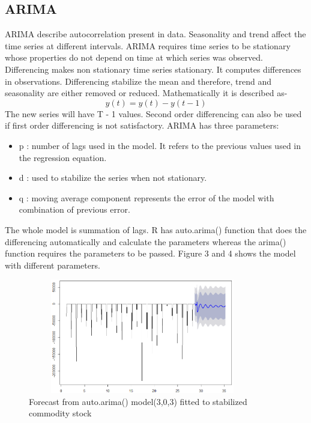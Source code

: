 \documentclass[runningheads]{llncs}
\begin{document}
\subsection{ARIMA}
ARIMA describe autocorrelation present in data. Seasonality and trend affect the time series at different intervals. ARIMA requires time series to be stationary whose properties do not depend on time at which series was observed.
\linebreak
Differencing makes non stationary time series stationary. It computes differences in observations. Differencing stabilize the mean and therefore, trend and seasonality are either removed or reduced. Mathematically it is described as-
\begin{equation*}
  y(t) = y(t) - y(t-1) 
\end{equation*}
The new series will have T - 1 values. Second order differencing can also be used if first order differencing is not satisfactory.
ARIMA has three parameters:
\begin{itemize}
\item p : number of lags used in the model. It refers to the previous values used in the regression equation.
\item d : used to stabilize the series when not stationary.
\item q : moving average component represents the error of the model with combination of previous error.
\end{itemize}

The whole model is summation of lags. R has auto.arima() function that does the differencing automatically and calculate the parameters whereas the arima() function requires the parameters to be passed. Figure 3 and 4 shows the model with different parameters.

\begin{figure}
\centering
\includegraphics[scale=1,width=10cm,height=5cm]{ArimaNew.png} 
\caption{Forecast from auto.arima() model(3,0,3) fitted to stabilized commodity stock}
\end{figure}
\end{document}
